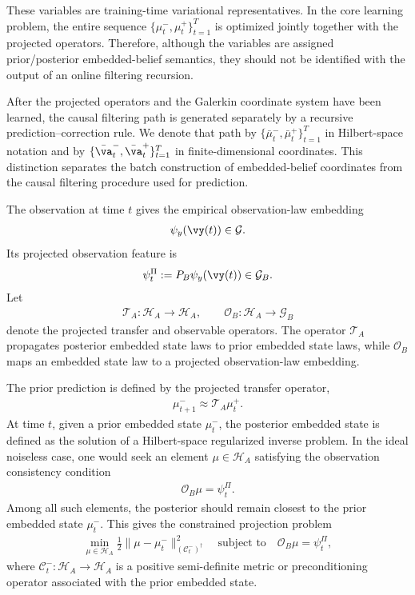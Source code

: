 \documentclass[twoside,11pt]{article}
\begin{document}
These variables are training-time variational representatives. In the
core learning problem, the entire sequence
$\{\mu_t^-,\mu_t^+\}_{t=1}^T$ is optimized jointly together with the
projected operators. Therefore, although the variables are assigned
prior/posterior embedded-belief semantics, they should not be identified
with the output of an online filtering recursion.

After the projected operators and the Galerkin coordinate system have
been learned, the causal filtering path is generated separately by a
recursive prediction--correction rule. We denote that path by
$\{\bar\mu_t^-,\bar\mu_t^+\}_{t=1}^T$ in Hilbert-space notation and by
$\{\bar{\va}_t^-,\bar{\va}_t^+\}_{t=1}^T$ in finite-dimensional
coordinates. This distinction separates the batch construction of
embedded-belief coordinates from the causal filtering procedure used for
prediction.

The observation at time $t$ gives the empirical observation-law
embedding
\begin{align}
\psi_y(\vy(t))\in\mathcal G.
\end{align}
Its projected observation feature is
\begin{align}
\psi_t^\Pi
:=
P_B\psi_y(\vy(t))
\in\mathcal G_B.
\label{eq:projected_observation_embedding_revised}
\end{align}
Let
\begin{align}
\mathcal T_A:\mathcal H_A\to\mathcal H_A,
\qquad
\mathcal O_B:\mathcal H_A\to\mathcal G_B
\label{eq:projected_transfer_observable_hilbert}
\end{align}
denote the projected transfer and observable operators. The operator
$\mathcal T_A$ propagates posterior embedded state laws to prior
embedded state laws, while $\mathcal O_B$ maps an embedded state law to
a projected observation-law embedding.

The prior prediction is defined by the projected transfer operator,
\begin{align}
\mu_{t+1}^-
\approx
\mathcal T_A \mu_t^+.
\label{eq:prior_prediction_hilbert}
\end{align}
At time $t$, given a prior embedded state $\mu_t^-$, the posterior
embedded state is defined as the solution of a Hilbert-space
regularized inverse problem. In the ideal noiseless case, one would seek
an element $\mu\in\mathcal H_A$ satisfying the observation consistency
condition
\begin{align}
\mathcal O_B\mu
=
\psi_t^\Pi.
\label{eq:hard_observation_consistency}
\end{align}
Among all such elements, the posterior should remain closest to the
prior embedded state $\mu_t^-$. This gives the constrained projection
problem
\begin{align}
\min_{\mu\in\mathcal H_A}
\frac12
\|\mu-\mu_t^-\|_{(\mathcal C_t^-)^\dagger}^2
\quad
\text{subject to}
\quad
\mathcal O_B\mu=\psi_t^\Pi,
\label{eq:hard_projection_posterior_update}
\end{align}
where $\mathcal C_t^-:\mathcal H_A\to\mathcal H_A$ is a positive
semi-definite metric or preconditioning operator associated with the
prior embedded state.
\end{document}
